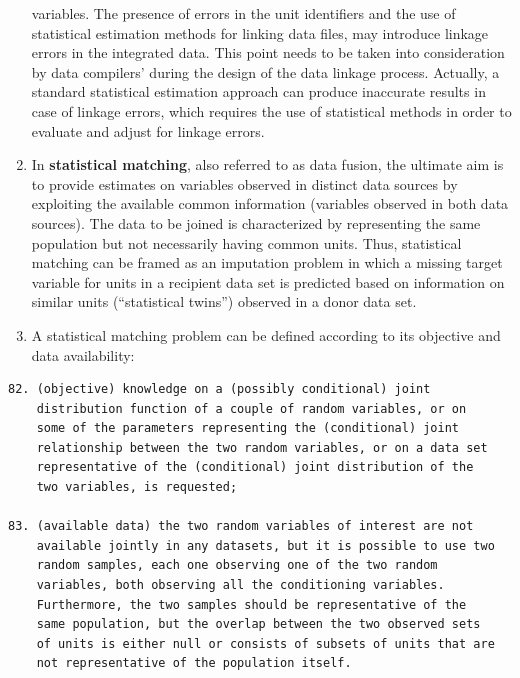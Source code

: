 \documentclass[
]{article}
\begin{document}
\begin{enumerate}
  variables. The presence of errors in the unit identifiers and the
  use of statistical estimation methods for linking data files, may
  introduce linkage errors in the integrated data. This point needs to
  be taken into consideration by data compilers' during the design of
  the data linkage process. Actually, a standard statistical
  estimation approach can produce inaccurate results in case of
  linkage errors, which requires the use of statistical methods in
  order to evaluate and adjust for linkage errors.
\item
  In \textbf{statistical matching}, also referred to as data fusion, the
  ultimate aim is to provide estimates on variables observed in
  distinct data sources by exploiting the available common information
  (variables observed in both data sources). The data to be joined is
  characterized by representing the same population but not
  necessarily having common units. Thus, statistical matching can be
  framed as an imputation problem in which a missing target variable
  for units in a recipient data set is predicted based on information
  on similar units (``statistical twins'') observed in a donor data set.
\item
  A statistical matching problem can be defined according to its
  objective and data availability:
\end{enumerate}

\begin{verbatim}
82. (objective) knowledge on a (possibly conditional) joint
    distribution function of a couple of random variables, or on
    some of the parameters representing the (conditional) joint
    relationship between the two random variables, or on a data set
    representative of the (conditional) joint distribution of the
    two variables, is requested;

83. (available data) the two random variables of interest are not
    available jointly in any datasets, but it is possible to use two
    random samples, each one observing one of the two random
    variables, both observing all the conditioning variables.
    Furthermore, the two samples should be representative of the
    same population, but the overlap between the two observed sets
    of units is either null or consists of subsets of units that are
    not representative of the population itself.
\end{verbatim}
\end{document}
